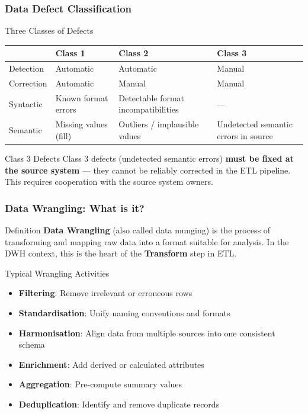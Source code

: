 \begin{frame}
  \frametitle{Data Defect Classification}

  \begin{block}{Three Classes of Defects}
    \begin{tabularx}{\linewidth}{@{}l X X X@{}}
      \toprule
      & \textbf{Class 1}            & \textbf{Class 2}                  & \textbf{Class 3} \\
      \midrule
      Detection  & Automatic               & Automatic                         & Manual \\
      Correction & Automatic               & Manual                            & Manual \\
      \midrule
      Syntactic  & Known format errors     & Detectable format incompatibilities & --- \\
      Semantic   & Missing values (fill)   & Outliers / implausible values       & Undetected semantic errors in source \\
      \bottomrule
    \end{tabularx}
  \end{block}

  \begin{alertblock}{Class 3 Defects}
    Class 3 defects (undetected semantic errors) \textbf{must be fixed at the source
    system} --- they cannot be reliably corrected in the ETL pipeline.
    This requires cooperation with the source system owners.
  \end{alertblock}
\end{frame}


\begin{frame}
  \frametitle{Data Wrangling: What is it?}

  \begin{block}{Definition}
    \textbf{Data Wrangling} (also called data munging) is the process of
    transforming and mapping raw data into a format suitable for analysis.
    In the DWH context, this is the heart of the \textbf{Transform} step in ETL.
  \end{block}

  \begin{block}{Typical Wrangling Activities}
    \begin{itemize}
      \item \textbf{Filtering}: Remove irrelevant or erroneous rows
      \item \textbf{Standardisation}: Unify naming conventions and formats
      \item \textbf{Harmonisation}: Align data from multiple sources into one consistent schema
      \item \textbf{Enrichment}: Add derived or calculated attributes
      \item \textbf{Aggregation}: Pre-compute summary values
      \item \textbf{Deduplication}: Identify and remove duplicate records
    \end{itemize}
  \end{block}
\end{frame}

